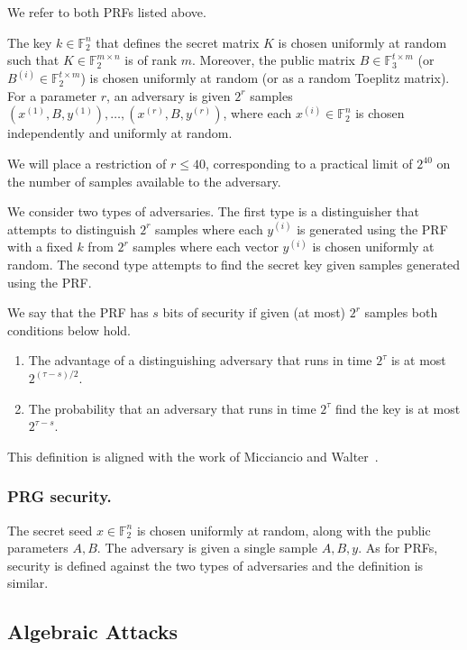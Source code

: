 \documentclass[orivec,envcountsect]{llncs}
\begin{document}
We refer to both PRFs listed above.

The key $k \in \mathbb{F}_2^n$ that defines the secret matrix $K$ is chosen uniformly at random such that
$K \in \mathbb{F}_2^{m \times n}$ is of rank $m$.
Moreover, the public matrix
$B \in \mathbb{F}_3^{t \times m}$ (or $B^{(i)} \in \mathbb{F}_2^{t \times m}$) is chosen uniformly at random
(or as a random Toeplitz matrix).
For a parameter $r$, an adversary is given $2^{r}$ samples $(x^{(1)},B,y^{(1)}) ,\ldots, (x^{(r)},B,y^{(r)})$,
where each $x^{(i)} \in \mathbb{F}_2^n$ is chosen independently and uniformly at random.

We will place a restriction of $r \leq 40$,
corresponding to a practical limit of $2^{40}$ on the number of samples available to the adversary.

We consider two types of adversaries. 
The first type is a distinguisher that attempts to distinguish $2^r$ samples where each $y^{(i)}$
is generated using the PRF with a fixed $k$ from
$2^r$ samples where each vector $y^{(i)}$ is chosen uniformly at random.
The second type attempts to find the secret key given samples generated using the PRF.

We say that the PRF has $s$ bits of security if given (at most) $2^r$ samples both conditions below hold. 
\begin{enumerate}
  \item The advantage of a distinguishing adversary that runs in time $2^\tau$ is at most $2^{(\tau - s)/2}$.
  \item The probability that an adversary that runs in time $2^\tau$ find the key is at most $2^{\tau - s}$.
\end{enumerate} 
This definition is aligned with the work of Micciancio and Walter~\cite{Micciancio018}.


\subsubsection{PRG security.}

The secret seed $x \in \mathbb{F}_2^n$ is chosen uniformly at random, along with the public parameters $A,B$.
The adversary is given a single sample $A,B,y$.
As for PRFs, security is defined against the two types of adversaries and the definition is similar. 

\subsection{Algebraic Attacks}
\end{document}
